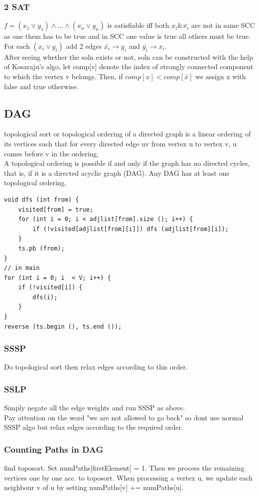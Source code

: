 \documentclass[8pt, a4paper, oneside, twocolumn]{extarticle}
\begin{document}
\subsubsection{2 SAT}
$f = (x_1 \vee y_1) \wedge \dots \wedge (x_n \vee y_n)$ is satisfiable iff both $x_i \& \bar{x_i}$ are not in same SCC as one them has to be true and in SCC one value is true all others must be true. For each $(x_i \vee y_i)$ add 2 edges $\bar{x_i} \rightarrow y_i$ and $\bar{y_i} \rightarrow x_i$. 
\\After seeing whether the soln exists or not, soln can be constructed with the help of Kosaraju's algo, let comp[v] denote the index of strongly connected component to which the vertex v belongs. Then, if $comp[x] < comp[\bar{x}]$ we assign x with false and true otherwise.
\subsection{DAG}
topological sort or topological ordering of a directed graph is a linear ordering of its vertices such that for every directed edge uv from vertex u to vertex v, u comes before v in the ordering.
\\A topological ordering is possible if and only if the graph has no directed cycles, that is, if it is a directed acyclic graph (DAG). Any DAG has at least one topological ordering.
\begin{verbatim}
void dfs (int from) {
    visited[from] = true;
    for (int i = 0; i < adjlist[from].size (); i++) {
        if (!visited[adjlist[from][i]]) dfs (adjlist[from][i]);
    }
    ts.pb (from); 
}
// in main
for (int i = 0; i  < V; i++) {
    if (!visited[i]) {
        dfs(i);
    }
}
reverse (ts.begin (), ts.end ());
\end{verbatim}
\subsubsection{SSSP}
Do topological sort then relax edges according to this order.
\subsubsection{SSLP}
Simply negate all the edge weights and run SSSP as above.
\\Pay attention on the word "we are not allowed to go back" so dont use normal SSSP algo but relax edges according to the required order.
\subsubsection{Counting Paths in DAG}
find toposort. Set numPaths[firstElement] = 1. Then we process the remaining vertices one by one acc. to toposort. When processing a vertex u, we update each neighbour v of u by setting numPaths[v] += numPaths[u].
\end{document}
